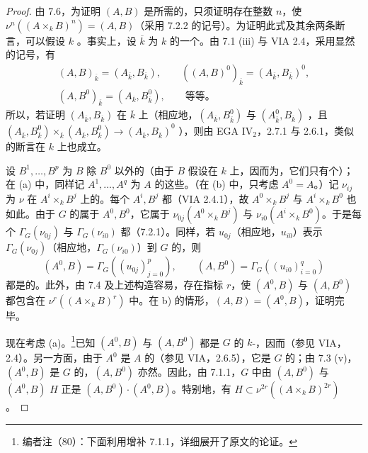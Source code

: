\begin{proof}
由 7.6，为证明 $(A,B)$ 是所需的，只须证明存在整数 $n$，使 $\nu^n((A\times_k B)^n)=(A,B)$（采用 7.2.2 的记号）。为证明此式及其余两条断言，可以假设
$k$ 。事实上，设 $\overline k$ 为 $k$ 的一个。由 7.1 (iii) 与 VIA 2.4，采用显然的记号，有
\[
\begin{gathered}
(A,B)_{\overline k}=(A_{\overline k},B_{\overline k}),\qquad
((A,B)^0)_{\overline k}=(A_{\overline k},B_{\overline k})^0,\\
(A,B^0)_{\overline k}=(A_{\overline k},B^0_{\overline k}),\qquad\text{等等。}
\end{gathered}
\]
所以，若证明 $(A_{\overline k},B_{\overline k})$ 在 $\overline k$ 上（相应地，$(A_{\overline k},B^0_{\overline k})$ 与 $(A^0_{\overline k},B_{\overline k})$ ，且 $(A_{\overline k},B^0_{\overline k})\times_{\overline k}(A_{\overline k},B^0_{\overline k})\to(A_{\overline k},B_{\overline k})^0$ ），则由 EGA $\mathrm{IV}_2$，2.7.1 与 2.6.1，类似的断言在 $k$ 上也成立。

设 $B^1,\ldots,B^p$ 为 $B$ 除 $B^0$ 以外的（由于 $B$ 假设在 $k$ 上，因而为，它们只有个）；在 (a) 中，同样记 $A^1,\ldots,A^q$ 为 $A$ 的这些。（在 (b) 中，只考虑 $A^0=A$。）记 $\nu_{ij}$ 为 $\nu$ 在 $A^i\times_k B^j$ 上的。每个 $A^i,B^j$ 都（VIA 2.4.1），故 $A^0\times_k B^j$ 与 $A^i\times_k B^0$ 也如此。由于 $G$ 的属于 $A^0,B^0$，它属于 $\nu_{0j}(A^0\times_k B^j)$ 与 $\nu_{i0}(A^i\times_k B^0)$。于是每个 $\Gamma_G(\nu_{0j})$ 与 $\Gamma_G(\nu_{i0})$ 都（7.2.1）。同样，若 $u_{0j}$（相应地，$u_{i0}$）表示 $\Gamma_G(\nu_{0j})$（相应地，$\Gamma_G(\nu_{i0})$）到 $G$ 的，则
\[
(A^0,B)=\Gamma_G((u_{0j})_{j=0}^p),\qquad
(A,B^0)=\Gamma_G((u_{i0})_{i=0}^q)
\]
都是的。此外，由 7.4 及上述构造容易，存在指标 $r$，使 $(A^0,B)$ 与 $(A,B^0)$ 都包含在 $\nu^r((A\times_k B)^r)$ 中。在 b) 的情形，$(A,B)=(A^0,B)$，证明完毕。

现在考虑 (a)。\footnote{编者注（80）：下面利用增补 7.1.1，详细展开了原文的论证。}已知 $(A^0,B)$ 与 $(A,B^0)$ 都是 $G$ 的 $k$-，因而（参见 VIA，2.4）。另一方面，由于 $A^0$ 是 $A$ 的（参见 VIA，2.6.5），它是 $G$ 的；由 7.3 (v)，$(A^0,B)$ 是 $G$ 的，$(A,B^0)$ 亦然。因此，由 7.1.1，$G$ 中由 $(A,B^0)$ 与 $(A^0,B)$  $H$ 正是 $(A,B^0)\cdot(A^0,B)$。特别地，有 $H\subset\nu^{2r}((A\times_k B)^{2r})$。


\end{proof}
